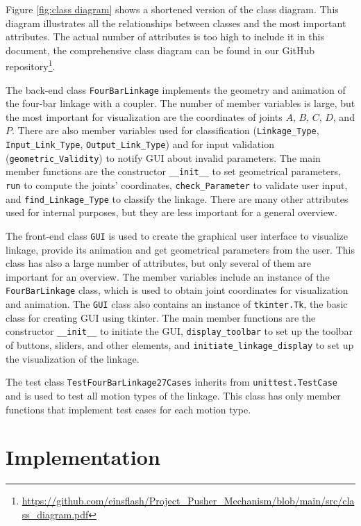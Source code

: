 \documentclass{article}
\begin{document}
Figure \ref{fig:class diagram} shows a shortened version of the class diagram. This diagram illustrates all the relationships between classes and the most important attributes. The actual number of attributes is too high to include it in this document, the comprehensive class diagram can be found in our GitHub repository\footnote{\url{https://github.com/einsflash/Project_Pusher_Mechanism/blob/main/src/class_diagram.pdf}}.

The back-end class \texttt{FourBarLinkage} implements the geometry and animation of the four-bar linkage with a coupler. The number of member variables is large, but the most important for visualization are the coordinates of joints $A$, $B$, $C$, $D$, and $P$. There are also member variables used for classification (\texttt{Linkage\_Type}, \texttt{Input\_Link\_Type}, \texttt{Output\_Link\_Type}) and for input validation (\texttt{geometric\_Validity}) to notify GUI about invalid parameters. The main member functions are the constructor \texttt{\_\_init\_\_} to set geometrical parameters, \texttt{run} to compute the joints' coordinates, \texttt{check\_Parameter} to validate user input, and \texttt{find\_Linkage\_Type} to classify the linkage. There are many other attributes used for internal purposes, but they are less important for a general overview.

The front-end class \texttt{GUI} is used to create the graphical user interface to visualize linkage, provide its animation and get geometrical parameters from the user. This class has also a large number of attributes, but only several of them are important for an overview. The member variables include an instance of the \texttt{FourBarLinkage} class, which is used to obtain joint coordinates for visualization and animation. The \texttt{GUI} class also contains an instance of \texttt{tkinter.Tk}, the basic class for creating GUI using tkinter. The main member functions are the constructor \texttt{\_\_init\_\_} to initiate the GUI, \texttt{display\_toolbar} to set up the toolbar of buttons, sliders, and other elements, and \texttt{initiate\_linkage\_display} to set up the visualization of the linkage.

The test class \texttt{TestFourBarLinkage27Cases} inherits from \texttt{unittest.TestCase} and is used to test all motion types of the linkage. This class has only member functions that implement test cases for each motion type.

\section{Implementation} \label{ch:implementation}
\end{document}
